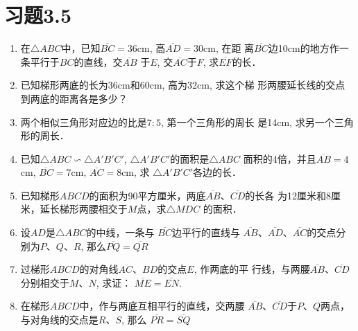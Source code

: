 \section*{习题3.5}
\begin{enumerate}
    \item 在$\triangle ABC$中，已知$\overline{BC}=36$cm, 高$\overline{AD}=30$cm, 在距
    离$\overline{BC}$边10cm的地方作一条平行于$BC$的直线，交$\overline{AB}$
    于$E$, 交$\overline{AC}$于$F$, 求$\overline{EF}$的长．
    \item 已知梯形两底的长为36cm和60cm, 高为32cm, 求这个梯
    形两腰延长线的交点到两底的距离各是多少？
    \item 两个相似三角形对应边的比是$7:5$, 第一个三角形的周长
    是14cm, 求另一个三角形的周长．
    \item 已知$\triangle ABC\backsim \triangle A'B'C'$, $\triangle A'B'C'$的面积是$\triangle ABC$
    面积的4倍，并且$\overline{AB}=4$cm, $\overline{BC}=7$cm, $\overline{AC}=8$cm, 求
    $\triangle A'B'C'$各边的长．
    \item 已知梯形$ABCD$的面积为90平方厘米，两底$\overline{AB}$、$\overline{CD}$的长各
    为12厘米和8厘米，延长梯形两腰相交于$M$点，求$\triangle MDC$
    的面积．
    \item 设$AD$是$\triangle ABC$的中线，一条与
    $\overline{BC}$边平行的直线与
    $\overline{AB}$、$\overline{AD}$、$\overline{AC}$的交点分别为$P$、$Q$、$R$, 那么$\overline{PQ}=\overline{QR}$
    \item 过梯形$ABCD$的对角线$AC$、$BD$的交点$E$, 作两底的平
    行线，与两腰$\overline{AB}$、$\overline{CD}$分别相交于$M$、$N$, 求证：
    $\overline{ME}=\overline{EN}$.
    \item 在梯形$ABCD$中，作与两底互相平行的直线，交两腰
    $\overline{AB}$、$\overline{CD}$于$P$、$Q$两点，与对角线的交点是$R$、$S$, 那么
    $\overline{PR}=\overline{SQ}$
\end{enumerate}

